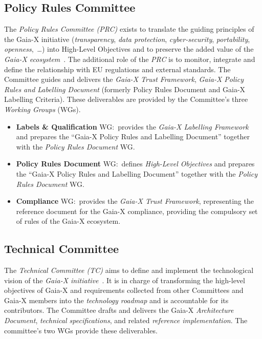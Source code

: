 \subsection{Policy Rules Committee}\label{subsec:policy-rules-committee}

The \textit{Policy Rules Committee (PRC)} exists to translate the guiding principles of the Gaia-X initiative (\textit{transparency}, \textit{data protection}, \textit{cyber-security}, \textit{portability}, \textit{openness},~\ldots) into High-Level Objectives and to preserve the added value of the \textit{Gaia-X ecosystem}~\cite{gaiax}.
The additional role of the \textit{PRC} is to monitor, integrate and define the relationship with EU regulations and external standards.
The Committee guides and delivers the \textit{Gaia-X Trust Framework}, \textit{Gaia-X Policy Rules and Labelling Document} (formerly Policy Rules Document and Gaia-X Labelling Criteria).
These deliverables are provided by the Committee's three \textit{Working Groups} (WGs).
\begin{itemize}
    \item \textbf{Labels \& Qualification} WG:~provides the \textit{Gaia-X Labelling Framework} and prepares the ``Gaia-X Policy Rules and Labelling Document'' together with the \textit{Policy Rules Document} WG.
    \item \textbf{Policy Rules Document} WG:~defines \textit{High-Level Objectives} and prepares the ``Gaia-X Policy Rules and Labelling Document'' together with the \textit{Policy Rules Document} WG.
    \item \textbf{Compliance} WG:~provides the \textit{Gaia-X Trust Framework}, representing the reference document for the Gaia-X compliance, providing the compulsory set of rules of the Gaia-X ecosystem.
\end{itemize}

\subsection{Technical Committee}\label{subsec:technical-committee}

The \textit{Technical Committee (TC)} aims to define and implement the technological vision of the \textit{Gaia-X initiative}~\cite{gaiax}.
It is in charge of transforming the high-level objectives of Gaia-X and requirements collected from other Committees and Gaia-X members into the \textit{technology roadmap} and is accountable for its contributors.
The Committee drafts and delivers the Gaia-X \textit{Architecture Document}, \textit{technical specifications}, and related \textit{reference implementation}.
The committee's two WGs provide these deliverables.

